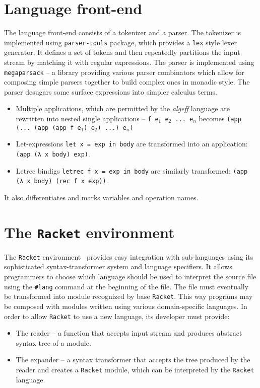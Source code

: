 \documentclass[inz, english, longabstract]{iithesis}
\newcommand{\Racket}{\texttt{Racket}}
\begin{document}
\section{Language front-end}\label{sec:front-end}
The language front-end consists of a tokenizer and a parser.
The tokenizer is implemented using \texttt{parser-tools} package, which provides a \texttt{lex} style lexer generator.
It defines a set of tokens and then repeatedly partitions the input stream by matching it with regular expressions.
The parser is implemented using \texttt{megaparsack} -- a library providing various parser combinators which allow for composing simple parsers together to build complex ones in monadic style.
The parser desugars some surface expressions into simpler calculus terms.
\begin{itemize}
  \item Multiple applications, which are permitted by the \emph{algeff} language are rewritten into nested single applications -- \texttt{f e$_1$ e$_2$ ... e$_n$} becomes \texttt{(app (... (app (app f e$_1$) e$_2$) ...) e$_n$)}
  \item Let-expressions \texttt{let x = exp in body} are transformed into an application: \texttt{(app (λ x body) exp)}.
  \item Letrec bindigs \texttt{letrec f x = exp in body} are similarly transformed: \texttt{(app (λ x body) (rec f x exp))}.
\end{itemize}
It also differentiates and marks variables and operation names.

\section{The \Racket{} environment}\label{sec:racket-env}
The \Racket{} environment~\cite{PLT1} provides easy integration with sub-languages using its sophisticated syntax-transformer system and language specifiers.
It allows programmers to choose which language should be used to interpret the source file using the \texttt{\#lang} command at the beginning of the file.
The file must eventually be transformed into module recognized by base \Racket{}.
This way programs may be composed with modules written using various domain-specific languages.
In order to allow \Racket{} to use a new language, its developer must provide:
\begin{itemize}
  \item The reader -- a function that accepts input stream and produces abstract syntax tree of a module.
  \item The expander -- a syntax transformer that accepts the tree produced by the reader and creates a \Racket{} module, which can be interpreted by the \Racket{} language.
\end{itemize}
\end{document}
